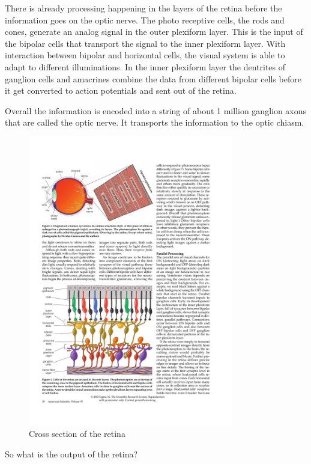 		There is already processing happening in the layers of the retina before the information goes on the optic nerve. The photo receptive cells, the rods and cones, generate an analog signal in the outer plexiform layer. This is the input of the bipolar cells that transport the signal to the inner plexiform layer. With interaction between bipolar and horizontal cells, the visual system is able to adapt to different illuminations. In the inner plexiform layer the dentrites of ganglion cells and amacrines combine the data from different bipolar cells before it get converted to action potentials and sent out of the retina.
		
		Overall the information is encoded into a string of about 1 million ganglion axons that are called the optic nerve. It transports the information to the optic chiasm.
		
		\begin{figure}[H]
			\centering
			\includegraphics[width=0.8\textwidth, trim=1cm 5cm 8cm 15cm, clip]{images/kolb-2003-howtheretinaworks-p3.pdf}
			\caption{Cross section of the retina \citep{kolb2003retina}}
		\end{figure}
		
		So what is the output of the retina?
		
